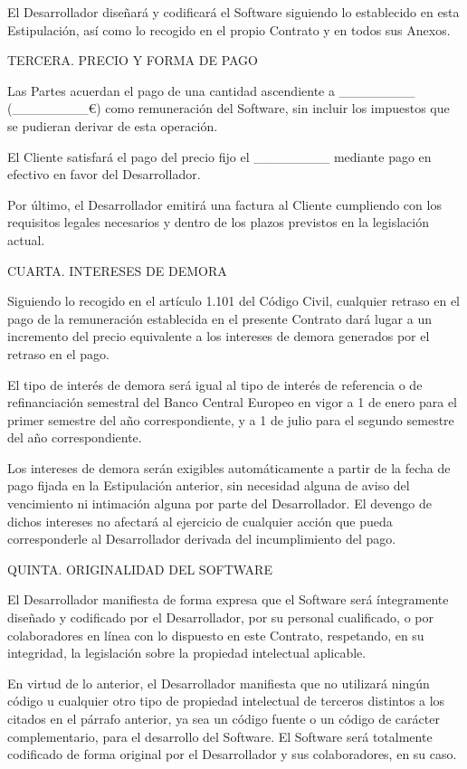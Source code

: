 \documentclass[a4paper,11pt]{report}
\begin{document}
	El Desarrollador diseñará y codificará el Software siguiendo lo
	establecido en esta Estipulación, así como lo recogido en el propio
	Contrato y en todos sus Anexos.
	
	TERCERA. PRECIO Y FORMA DE PAGO
	
	Las Partes acuerdan el pago de una cantidad ascendiente a \_\_\_\_\_\_\_\_
	(\_\_\_\_\_\_\_\_€) como remuneración del Software, sin incluir los impuestos
	que se pudieran derivar de esta operación.
	
	El Cliente satisfará el pago del precio fijo el \_\_\_\_\_\_\_\_ mediante pago
	en efectivo en favor del Desarrollador.
	
	Por último, el Desarrollador emitirá una factura al Cliente cumpliendo
	con los requisitos legales necesarios y dentro de los plazos previstos
	en la legislación actual.
	
	CUARTA. INTERESES DE DEMORA
	
	Siguiendo lo recogido en el artículo 1.101 del Código Civil, cualquier
	retraso en el pago de la remuneración establecida en el presente
	Contrato dará lugar a un incremento del precio equivalente a los
	intereses de demora generados por el retraso en el pago.
	
	El tipo de interés de demora será igual al tipo de interés de referencia
	o de refinanciación semestral del Banco Central Europeo en vigor a 1 de
	enero para el primer semestre del año correspondiente, y a 1 de julio
	para el segundo semestre del año correspondiente.
	
	Los intereses de demora serán exigibles automáticamente a partir de la
	fecha de pago fijada en la Estipulación anterior, sin necesidad alguna
	de aviso del vencimiento ni intimación alguna por parte del
	Desarrollador. El devengo de dichos intereses no afectará al ejercicio
	de cualquier acción que pueda corresponderle al Desarrollador derivada
	del incumplimiento del pago.
	
	QUINTA. ORIGINALIDAD DEL SOFTWARE
	
	El Desarrollador manifiesta de forma expresa que el Software será
	íntegramente diseñado y codificado por el Desarrollador, por su personal
	cualificado, o por colaboradores en línea con lo dispuesto en este
	Contrato, respetando, en su integridad, la legislación sobre la
	propiedad intelectual aplicable.
	
	En virtud de lo anterior, el Desarrollador manifiesta que no utilizará
	ningún código u cualquier otro tipo de propiedad intelectual de terceros
	distintos a los citados en el párrafo anterior, ya sea un código fuente
	o un código de carácter complementario, para el desarrollo del Software.
	El Software será totalmente codificado de forma original por el
	Desarrollador y sus colaboradores, en su caso.
	
\end{document}
